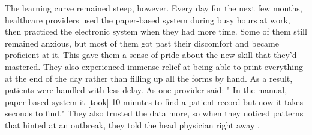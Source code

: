 The learning curve remained steep, however. Every day for the next few months, healthcare providers used the paper-based system during busy hours at work, then practiced the electronic system when they had more time. Some of them still remained anxious, but most of them got past their discomfort and became proficient at it. This gave them a sense of pride about the new skill that they'd mastered. They also experienced immense relief at being able to print everything at the end of the day rather than filling up all the forms by hand. As a result, patients were handled with less delay. As one provider said: " In the manual, paper-based system it [took] 10 minutes to find a patient record but now it takes seconds to find." They also trusted the data more, so when they noticed patterns that hinted at an outbreak, they told the head physician right away \cite{premji2012implementing}.
